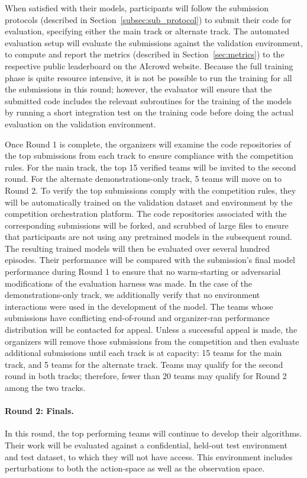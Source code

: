 When satisfied with their models, participants will follow the submission protocols (described in Section~\ref{subsec:sub_protocol}) to submit their code for evaluation, specifying either the main track or alternate track. 
The automated evaluation setup will evaluate the submissions against the validation environment, to compute and report the metrics (described in Section~\ref{sec:metrics}) to the respective public leaderboard on the AIcrowd website. 
Because the full training phase is quite resource intensive, it is not be possible to run the training for all the submissions in this round; however, the evaluator will ensure that the submitted code includes the relevant subroutines for the training of the models by running a short integration test on the training code before doing the actual evaluation on the validation environment.


Once Round 1 is complete, the organizers will examine the code repositories of the top submissions from each track to ensure compliance with the competition rules. For the main track, the top 15 verified teams will be invited to the second round. For the alternate demonstrations-only track, 5 teams will move on to Round 2. To verify the top submissions comply with the competition rules, they will be automatically trained on the validation dataset and environment by the competition orchestration platform. The code repositories associated with the corresponding submissions will be forked, and scrubbed of large files to ensure that participants are not using any pretrained models in the subsequent round.   
The resulting trained models will then be evaluated over several hundred episodes.
Their performance will be compared with the submission's final model performance during Round 1 to ensure that no warm-starting or adversarial modifications of the evaluation harness was made. In the case of the demonstrations-only track, we additionally verify that no environment interactions were used in the development of the model.
The teams whose submissions have conflicting end-of-round and organizer-ran performance distribution will be contacted for appeal. 
Unless a successful appeal is made, the organizers will remove those submissions from the competition and then evaluate additional submissions until each track is at capacity: 15 teams for the main track, and 5 teams for the alternate track. Teams may qualify for the second round in both tracks; therefore, fewer than 20 teams may qualify for Round 2 among the two tracks. 


\paragraph{Round 2: Finals.} 
In this round, the top performing teams will continue to develop their algorithms.
Their work will be evaluated against a confidential, held-out test environment and test dataset, to which they will not have access. This environment includes perturbations to both the action-space as well as the observation space.


